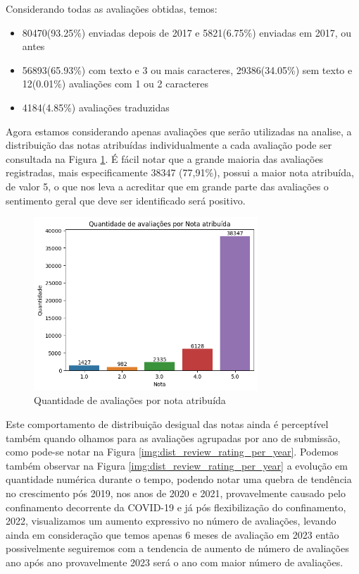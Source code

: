 Considerando todas as avaliações obtidas, temos:

\begin{itemize}
	\item 80470(93.25\%) enviadas depois de 2017 e 5821(6.75\%) enviadas em 2017, ou antes
	\item 56893(65.93\%) com texto e 3 ou mais caracteres, 29386(34.05\%) sem texto e 12(0.01\%) avaliações com 1 ou 2 caracteres
	\item 4184(4.85\%) avaliações traduzidas
\end{itemize}

Agora estamos considerando apenas avaliações que serão utilizadas na analise, a distribuição das notas atribuídas individualmente a cada avaliação pode ser consultada na Figura \ref{img:dist_review_rating}. É fácil notar que a grande maioria das avaliações registradas, mais especificamente 38347 (77,91\%), possui a maior nota atribuída, de valor 5, o que nos leva a acreditar que em grande parte das avaliações o sentimento geral que deve ser identificado será positivo.

\begin{figure}
	\centering
	\includegraphics[width=0.75\textwidth]{figs/exploratoria/quantidade_avaliacao_nota_atribuida.png}
	\caption{Quantidade de avaliações por nota atribuída}
	\label{img:dist_review_rating}
\end{figure}

Este comportamento de distribuição desigual das notas ainda é perceptível também quando olhamos para as avaliações agrupadas por ano de submissão, como pode-se notar na Figura \ref{img:dist_review_rating_per_year}. Podemos também observar na Figura \ref{img:dist_review_rating_per_year} a evolução em quantidade numérica durante o tempo, podendo notar uma quebra de tendência no crescimento pós 2019, nos anos de 2020 e 2021, provavelmente causado pelo confinamento decorrente da COVID-19 \cite{Guardia2022} e já pós flexibilização do confinamento, 2022, visualizamos um aumento expressivo no número de avaliações, levando ainda em consideração que temos apenas 6 meses de avaliação em 2023 então possivelmente seguiremos com a tendencia de aumento de número de avaliações ano após ano provavelmente 2023 será o ano com maior número de avaliações.


